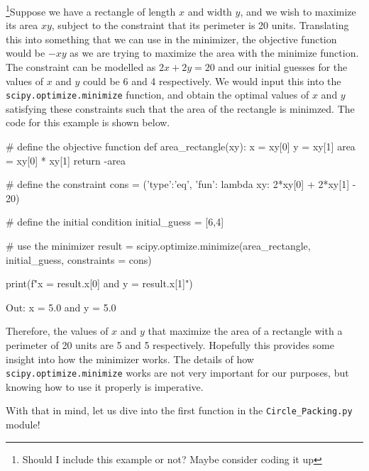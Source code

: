 \begin{flushleft}
\footnote{Should I include this example or not? Maybe consider coding it up}Suppose we have a rectangle of length $x$ and width $y$, and we wish to maximize its area $xy$, subject to the constraint that its perimeter is 20 units. Translating this into something that we can use in the minimizer, the objective function would be $-xy$ as we are trying to maximize the area with the minimize function. The constraint can be modelled as $2x+2y = 20$ and our initial guesses for the values of $x$ and $y$ could be 6 and 4 respectively. We would input this into the \texttt{scipy.optimize.minimize} function, and obtain the optimal values of $x$ and $y$ satisfying these constraints such that the area of the rectangle is minimzed. The code for this example is shown below.
\end{flushleft} 

\begin{code}
# define the objective function
def area_rectangle(xy):
    x = xy[0]
    y = xy[1]
    area = xy[0] * xy[1]
    return -area

# define the constraint
cons = ({'type':'eq', 'fun': lambda xy: 2*xy[0] + 2*xy[1] - 20})

# define the initial condition
initial_guess = [6,4]

# use the minimizer
result = scipy.optimize.minimize(area_rectangle, initial_guess, constraints = cons)

print(f"x = {result.x[0]} and y = {result.x[1]}")
\end{code}

\begin{code}
Out: x = 5.0 and y = 5.0    
\end{code}

\begin{flushleft}
Therefore, the values of $x$ and $y$ that maximize the area of a rectangle with a perimeter of 20 units are 5 and 5 respectively. Hopefully this provides some insight into how the minimizer works. The details of how \texttt{scipy.optimize.minimize} works are not very important for our purposes, but knowing how to use it properly is imperative. 
\end{flushleft}

\begin{flushleft}
With that in mind, let us dive into the first function in the \texttt{Circle\_Packing.py} module!
\end{flushleft}


